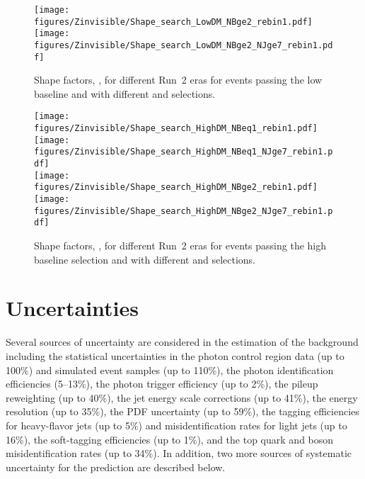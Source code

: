 \begin{figure}[tbp]
{
\centering
\texttt{[image: figures/Zinvisible/Shape\_search\_LowDM\_NBge2\_rebin1.pdf]}
\texttt{[image: figures/Zinvisible/Shape\_search\_LowDM\_NBge2\_NJge7\_rebin1.pdf]}
\caption[Shape factors, \Sg, for different Run~2 eras for events passing the low \dm baseline and with different \Nb and \Nj selections]
{
    Shape factors, \Sg, for different Run~2 eras for events passing the low \dm baseline and with different \Nb and \Nj selections.
}
\label{fig:shape_eras_lowdm_2}
}
\end{figure}

\begin{figure}[tbp]
{
\centering
\texttt{[image: figures/Zinvisible/Shape\_search\_HighDM\_NBeq1\_rebin1.pdf]}
\texttt{[image: figures/Zinvisible/Shape\_search\_HighDM\_NBeq1\_NJge7\_rebin1.pdf]}\\
\texttt{[image: figures/Zinvisible/Shape\_search\_HighDM\_NBge2\_rebin1.pdf]}
\texttt{[image: figures/Zinvisible/Shape\_search\_HighDM\_NBge2\_NJge7\_rebin1.pdf]}
\caption[Shape factors, \Sg, for different Run~2 eras for events passing the high \dm baseline selection and with different \Nb and \Nj selections]
{
    Shape factors, \Sg, for different Run~2 eras for events passing the high \dm baseline selection and with different \Nb and \Nj selections.
}
\label{fig:shape_eras_highdm}
}
\end{figure}

\section{Uncertainties}
\label{sec:zinvisible-uncertainties}

Several sources of uncertainty are considered in the estimation of the \znunu background including
the statistical uncertainties in the photon control region data (up to 100\%) and simulated event samples (up to 110\%),
the photon identification efficiencies (5--13\%),
the photon trigger efficiency (up to 2\%),
the pileup reweighting (up to 40\%),
the jet energy scale corrections (up to 41\%),
the \ptmiss energy resolution (up to 35\%),
the PDF uncertainty (up to 59\%),
the \PQb tagging efficiencies for heavy-flavor jets (up to 5\%) and misidentification rates for light jets (up to 16\%),
the soft-\PQb tagging efficiencies (up to 1\%), and
the top quark and \PW boson misidentification rates (up to 34\%).
In addition, two more sources of systematic uncertainty for the \znunu prediction are described below.

